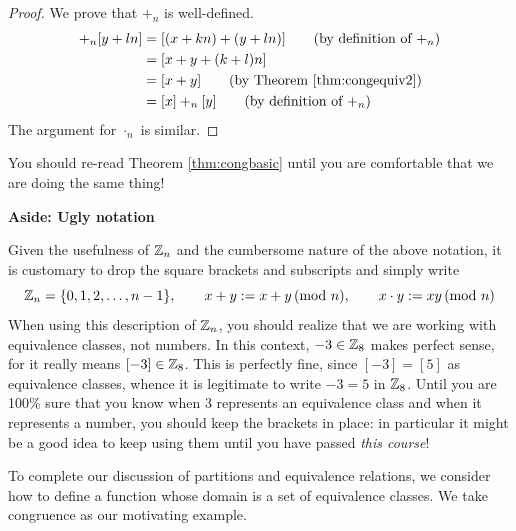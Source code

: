 \begin{proof}
	We prove that $+_n$ is well-defined.
	\begin{align*}
		[x+kn]+_n[y+ln]&=[(x+kn)+(y+ln)]\tag*{(by definition of $+_n$)}\\
		&=[x+y+(k+l)n]\\
		&=[x+y]\tag*{(by Theorem \ref{thm:congequiv2})}\\
		&=[x]+_n[y]\tag*{(by definition of $+_n$)}
	\end{align*}
	The argument for $\cdot_n$ is similar.
\end{proof}

You should re-read Theorem \ref{thm:congbasic} until you are comfortable that we are doing the same thing!

\begin{aside}{}{}
{\bf Aside: Ugly notation}

Given the usefulness of $\mathbb{Z}_n$ and the cumbersome nature of the above notation, it is customary to drop the square brackets and subscripts and simply write
\[
	\mathbb{Z}_n=\{0,1,2,\ldots,n-1\},\qquad x+y:=x+y\negthickspace\pmod{n},\qquad x\cdot y:=xy\negthickspace\pmod{n}
\]
When using this description of $\mathbb{Z}_n$, you should realize that we are working with equivalence classes, not numbers. In this context, $-3\in\mathbb{Z}_8$ makes perfect sense, for it really means $[-3]\in\mathbb{Z}_8$. This is perfectly fine, since $[-3]=[5]$ as equivalence classes, whence it is legitimate to write $-3=5$ in $\mathbb{Z}_8$. Until you are 100\% sure that you know when 3 represents an equivalence class and when it represents a number, you should keep the brackets in place: in particular it might be a good idea to keep using them until you have passed \emph{this course}!
\end{aside}



To complete our discussion of partitions and equivalence relations, we consider how to define a function whose domain is a set of equivalence classes. We take congruence as our motivating example.\par

